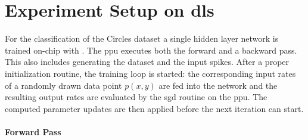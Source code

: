 \section{Experiment Setup on \gls{dls}}
\label{circlesimplementation}
For the classification of the Circles dataset a single hidden layer network is trained on-chip with . The \gls{ppu} executes both the forward and a backward pass. This also includes generating the dataset and the input spikes. After a proper initialization routine, the training loop is started: the corresponding input rates of a randomly drawn data point $p(x,y)$ are fed into the network and the resulting output rates are evaluated by the \gls{sgd} routine on the \gls{ppu}. The computed parameter updates are then applied before the next iteration can start.

\paragraph{Forward Pass}

